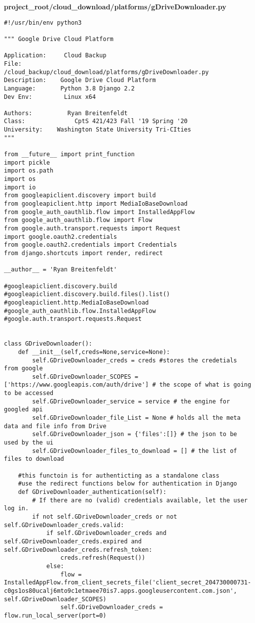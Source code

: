\documentclass{article}
\begin{document}
\newpage
\textbf{project\_root/cloud\_download/platforms/gDriveDownloader.py}
\begin{verbatim}
#!/usr/bin/env python3

""" Google Drive Cloud Platform

Application:     Cloud Backup
File:                 /cloud_backup/cloud_download/platforms/gDriveDownloader.py
Description:    Google Drive Cloud Platform
Language:       Python 3.8 Django 2.2
Dev Env:         Linux x64

Authors:          Ryan Breitenfeldt
Class:              CptS 421/423 Fall '19 Spring '20
University:    Washington State University Tri-CIties
"""

from __future__ import print_function
import pickle
import os.path
import os
import io
from googleapiclient.discovery import build
from googleapiclient.http import MediaIoBaseDownload
from google_auth_oauthlib.flow import InstalledAppFlow
from google_auth_oauthlib.flow import Flow
from google.auth.transport.requests import Request
import google.oauth2.credentials
from google.oauth2.credentials import Credentials
from django.shortcuts import render, redirect

__author__ = 'Ryan Breitenfeldt'

#googleapiclient.discovery.build
#googleapiclient.discovery.build.files().list()
#googleapiclient.http.MediaIoBaseDownload
#google_auth_oauthlib.flow.InstalledAppFlow
#google.auth.transport.requests.Request


class GDriveDownloader():
    def __init__(self,creds=None,service=None):
        self.GDriveDownloader_creds = creds #stores the credetials from google 
        self.GDriveDownloader_SCOPES = ['https://www.googleapis.com/auth/drive'] # the scope of what is going to be accessed
        self.GDriveDownloader_service = service # the engine for googled api
        self.GDriveDownloader_file_List = None # holds all the meta data and file info from Drive
        self.GDriveDownloader_json = {'files':[]} # the json to be used by the ui
        self.GDriveDownloader_files_to_download = [] # the list of files to download

    #this functoin is for authenticting as a standalone class
    #use the redirect functions below for authentication in Django
    def GDriveDownloader_authentication(self):
        # If there are no (valid) credentials available, let the user log in.
        if not self.GDriveDownloader_creds or not self.GDriveDownloader_creds.valid:
            if self.GDriveDownloader_creds and self.GDriveDownloader_creds.expired and self.GDriveDownloader_creds.refresh_token:
                creds.refresh(Request())
            else:
                flow = InstalledAppFlow.from_client_secrets_file('client_secret_204730000731-c0gs1os80ucalj6mto9c1etmaee70is7.apps.googleusercontent.com.json', self.GDriveDownloader_SCOPES)
                self.GDriveDownloader_creds = flow.run_local_server(port=0)


\end{verbatim}
\end{document}
